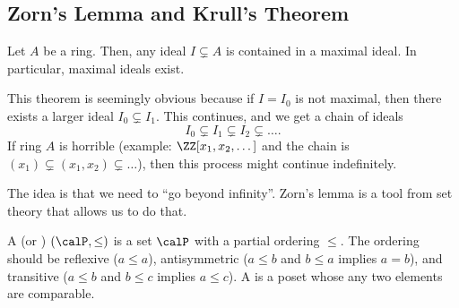 \subsection{Zorn's Lemma and Krull's Theorem}
\begin{theorem}
\label{thm:krull}
Let $A$ be a ring. Then, any ideal $I\subsetneq A$
is contained in a maximal ideal. In particular,
maximal ideals exist.
\end{theorem}
This theorem is seemingly obvious because if $I=I_0$ 
is not maximal, then there exists a larger ideal 
$I_0\subsetneq I_1$.
This continues, and we get a chain of ideals
$$I_0\subsetneq I_1 \subsetneq I_2 \subsetneq\dots.$$
If ring $A$ is horrible (example: $\ZZ[x_1,x_2,\dots]$
and the chain is $(x_1)\subsetneq (x_1,x_2)\subsetneq \dots$), 
then this process might continue indefinitely.

The idea is that we need to ``go beyond infinity''.
Zorn's lemma is a tool from set theory that allows us to do that.

A  (or ) 
$(\calP,\leq)$ is a set $\calP$ with a partial ordering $\leq$.
The ordering should be reflexive ($a\leq a$),
antisymmetric ($a\leq b$ and $b\leq a$ implies $a=b$),
and transitive ($a\leq b$ and $b\leq c$ implies 
$a\leq c$).
A  is a poset
whose any two elements are comparable.

